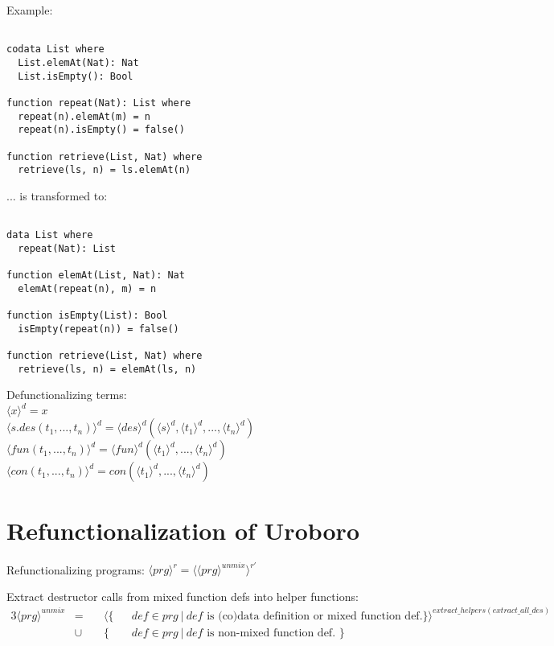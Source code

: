 \documentclass[11pt]{article} %
\begin{document}
Example:

\begin{lstlisting}

codata List where
  List.elemAt(Nat): Nat
  List.isEmpty(): Bool

function repeat(Nat): List where
  repeat(n).elemAt(m) = n
  repeat(n).isEmpty() = false()

function retrieve(List, Nat) where
  retrieve(ls, n) = ls.elemAt(n)

\end{lstlisting}

... is transformed to:

\begin{lstlisting}

data List where
  repeat(Nat): List

function elemAt(List, Nat): Nat
  elemAt(repeat(n), m) = n

function isEmpty(List): Bool
  isEmpty(repeat(n)) = false()

function retrieve(List, Nat) where
  retrieve(ls, n) = elemAt(ls, n)

\end{lstlisting}

Defunctionalizing terms: \\
$\langle x \rangle^d = x$ \\
$\langle s.des(t_1, ..., t_n) \rangle^d = \langle des \rangle^d (\langle s \rangle^d, \langle t_1 \rangle^d, ..., \langle t_n \rangle^d)$ \\
$\langle fun(t_1, ..., t_n) \rangle^d = \langle fun \rangle^d (\langle t_1 \rangle^d, ..., \langle t_n \rangle^d)$ \\
$\langle con(t_1, ..., t_n) \rangle^d = con(\langle t_1 \rangle^d, ..., \langle t_n \rangle^d)$ \\

\section{Refunctionalization of Uroboro}

Refunctionalizing programs: $\langle prg \rangle^r = \langle \langle prg \rangle^{unmix} \rangle^{r'}$

Extract destructor calls from mixed function defs into helper functions:
\begin{alignat*}{3}
\langle prg \rangle^{unmix} & = ~&& \langle \{ && def \in prg ~ | ~ def \textrm{ is (co)data definition or mixed function def.} \} \rangle^{extract\_helpers(extract\_all\_des)} \\
&\cup && \{ && def \in prg ~ | ~ def \textrm{ is non-mixed function def. } \}
\end{alignat*}
\end{document}
